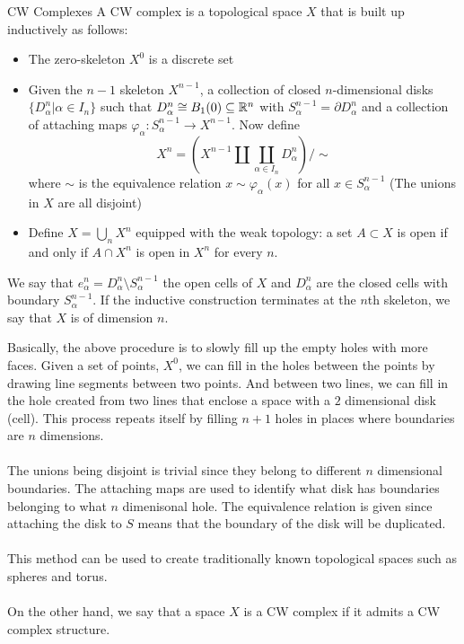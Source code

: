 \documentclass[a4paper]{article}
\begin{document}
\begin{defn}{CW Complexes}{} A CW complex is a topological space $X$ that is built up inductively as follows: 
\begin{itemize}
\item The zero-skeleton $X^0$ is a discrete set
\item Given the $n-1$ skeleton $X^{n-1}$, a collection of closed $n$-dimensional disks $\{D_{\alpha}^n|\alpha\in I_n\}$ such that $D_\alpha^n\cong B_1(0)\subseteq\mathbb{R}^n$ with $S_\alpha^{n-1}=\partial D_\alpha^n$ and a collection of attaching maps $\varphi_\alpha:S_\alpha^{n-1}\to X^{n-1}$. Now define $$X^n=\left(X^{n-1}\amalg\coprod_{\alpha\in I_n}D_\alpha^n\right)/\sim$$ where $\sim$ is the equivalence relation $x\sim\varphi_\alpha(x)$ for all $x\in S_\alpha^{n-1}$ (The unions in $X$ are all disjoint)
\item Define $X=\bigcup_nX^n$ equipped with the weak topology: a set $A\subset X$ is open if and only if $A\cap X^n$ is open in $X^n$ for every $n$. 
\end{itemize}
We say that $e_\alpha^n=D_\alpha^n\setminus S_\alpha^{n-1}$ the open cells of $X$ and $D_\alpha^n$ are the closed cells with boundary $S_\alpha^{n-1}$. If the inductive construction terminates at the $n$th skeleton, we say that $X$ is of dimension $n$. 
\end{defn}

Basically, the above procedure is to slowly fill up the empty holes with more faces. Given a set of points, $X^0$, we can fill in the holes between the points by drawing line segments between two points. And between two lines, we can fill in the hole created from two lines that enclose a space with a $2$ dimensional disk (cell). This process repeats itself by filling $n+1$ holes in places where boundaries are $n$ dimensions. \\~\\
The unions being disjoint is trivial since they belong to different $n$ dimensional boundaries. The attaching maps are used to identify what disk has boundaries belonging to what $n$ dimenisonal hole. The equivalence relation is given since attaching the disk to $S$ means that the boundary of the disk will be duplicated. \\~\\
This method can be used to create traditionally known topological spaces such as spheres and torus. \\~\\

On the other hand, we say that a space $X$ is a CW complex if it admits a CW complex structure. 
\end{document}
